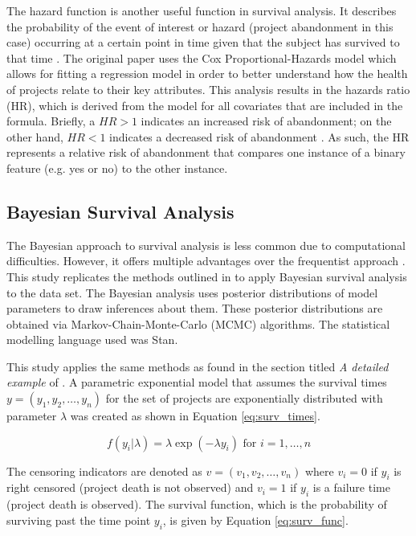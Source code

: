 \documentclass[sigconf,review]{acmart}
\begin{document}
The hazard function is another useful function in survival analysis. It describes the probability of the event of interest or hazard (project abandonment in this case) occurring at a certain point in time given that the subject has survived to that time \cite{clark2003go}.
The original paper uses the Cox Proportional-Hazards model which allows for fitting a regression model in order to better understand how the health of projects relate to their key attributes. 
This analysis results in the hazards ratio (HR), which is derived from the model for all covariates that are included in the formula. 
Briefly, a $HR > 1$ indicates an increased risk of abandonment; on the other hand, $HR < 1$ indicates a decreased risk of abandonment \cite{cox1972regression}. 
As such, the HR represents a relative risk of abandonment that compares one instance of a binary feature (e.g. yes or no) to the other instance.

\subsection{Bayesian Survival Analysis} \label{bayes_surv_analysis}

The Bayesian approach to survival analysis is less common due to computational difficulties. 
However, it offers multiple advantages over the frequentist approach \cite{kelter2020bayesian}. 
This study replicates the methods outlined in \cite{kelter2020bayesian} to apply Bayesian survival analysis to the data set.
The Bayesian analysis uses posterior distributions of model parameters to draw inferences about them. 
These posterior distributions are obtained via Markov-Chain-Monte-Carlo (MCMC) algorithms. 
The statistical modelling language used was Stan.

This study applies the same methods as found in the section titled \emph{A detailed example} of \cite{kelter2020bayesian}. 
A parametric exponential model that assumes the survival times $y = (y_1, y_2, \dots, y_n)$ for the set of projects are exponentially distributed with parameter $\lambda$ was created as shown in Equation \ref{eq:surv_times}.

\begin{equation} \label{eq:surv_times}
    f(y_i|\lambda) = \lambda\exp(- \lambda y_i) \mbox{ for } i=1,\dots,n
\end{equation}

The censoring indicators are denoted as $v = (v_1, v_2,\dots, v_n)$ where $v_i = 0$ if $y_i$ is right censored (project death is not observed) and $v_i = 1$ if $y_i$ is a failure time (project death is observed). The survival function, which is the probability of surviving past the time point $y_i$, is given by Equation \ref{eq:surv_func}.
\end{document}
